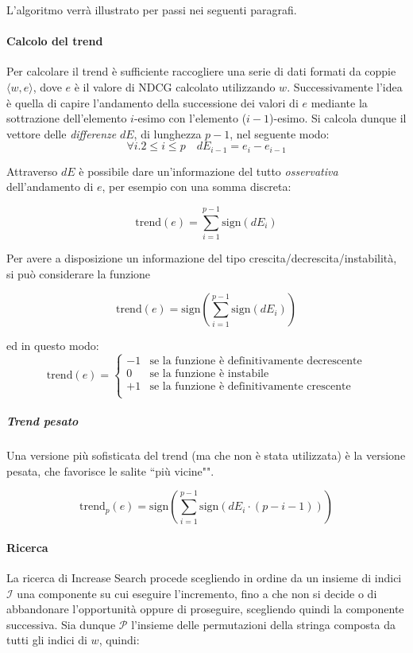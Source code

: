 L'algoritmo verrà illustrato per passi nei seguenti paragrafi.

\paragraph{Calcolo del trend}
Per calcolare il trend è sufficiente raccogliere una serie di dati formati
da coppie $\langle w, e\rangle$, dove $e$ è il valore di NDCG calcolato
utilizzando $w$. Successivamente l'idea è quella di capire
l'andamento della successione dei valori di $e$ mediante
la sottrazione dell'elemento $i$-esimo con l'elemento ($i-1$)-esimo.
Si calcola dunque il vettore delle \textit{differenze} $dE$, di lunghezza $p-1$, nel seguente modo:
$$
\forall{i.2 \leq i \leq p} \quad dE_{i-1} = e_{i} - e_{i-1}
$$

Attraverso $dE$ è possibile dare un'informazione del tutto
\textit{osservativa} dell'andamento di $e$, per esempio
con una somma discreta:

$$
\text{trend}(e) = \sum_{i=1}^{p-1} \text{sign}(dE_i)
$$

Per avere a disposizione un informazione del tipo crescita/decrescita/instabilità,
si può considerare la funzione

$$
\text{trend}(e) = \text{sign}\left(\sum_{i=1}^{p-1} \text{sign}(dE_i)\right)
$$

ed in questo modo:
$$
\text{trend}(e) =
\begin{cases}
-1 & \text{se la funzione è definitivamente decrescente} \\
0 & \text{se la funzione è instabile} \\
+1 & \text{se la funzione è definitivamente crescente} \\
\end{cases}
$$

\subparagraph{Trend pesato}
Una versione più sofisticata del trend (ma che non è stata utilizzata)
è la versione pesata, che favorisce le salite ``più vicine"".

$$
\text{trend}_p(e) = \text{sign}\left(\sum_{i=1}^{p-1} \text{sign}\left(dE_i \cdot (p-i-1)\right)\right)
$$


\paragraph{Ricerca}
La ricerca di Increase Search procede scegliendo in ordine da
un insieme di indici $\mathcal{I}$ una componente su cui eseguire
l'incremento, fino a che non si decide o di abbandonare
l'opportunità oppure di proseguire, scegliendo quindi la componente successiva.
Sia dunque $\mathcal{P}$ l'insieme delle permutazioni della stringa
composta da tutti gli indici di $w$, quindi:

